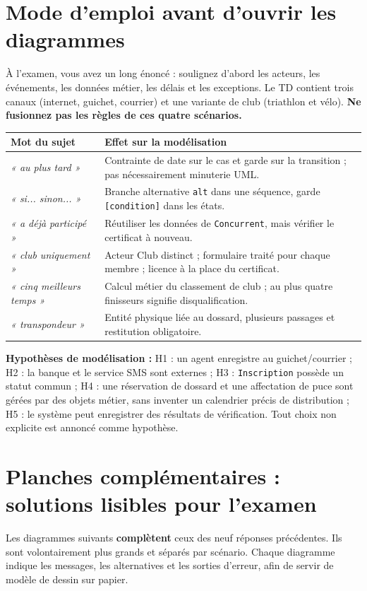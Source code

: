\documentclass[10pt,a4paper]{article}
\begin{document}
\section*{Mode d'emploi avant d'ouvrir les diagrammes}
\begin{memo}
À l'examen, vous avez un long énoncé : soulignez d'abord les acteurs, les événements, les données métier, les délais et les exceptions. Le TD contient trois canaux (internet, guichet, courrier) et une variante de club (triathlon et vélo). \textbf{Ne fusionnez pas les règles de ces quatre scénarios.}
\end{memo}
\begin{tabularx}{\linewidth}{@{}p{40mm}X@{}}\toprule
\textbf{Mot du sujet} & \textbf{Effet sur la modélisation} \\ \midrule
\textit{« au plus tard »} & Contrainte de date sur le cas et garde sur la transition ; pas nécessairement minuterie UML.\\
\textit{« si... sinon... »} & Branche alternative \texttt{alt} dans une séquence, garde \texttt{[condition]} dans les états.\\
\textit{« a déjà participé »} & Réutiliser les données de \texttt{Concurrent}, mais vérifier le certificat à nouveau.\\
\textit{« club uniquement »} & Acteur Club distinct ; formulaire traité pour chaque membre ; licence à la place du certificat.\\
\textit{« cinq meilleurs temps »} & Calcul métier du classement de club ; au plus quatre finisseurs signifie disqualification.\\
\textit{« transpondeur »} & Entité physique liée au dossard, plusieurs passages et restitution obligatoire.\\
\bottomrule\end{tabularx}
\textbf{Hypothèses de modélisation :} H1 : un agent enregistre au guichet/courrier ; H2 : la banque et le service SMS sont externes ; H3 : \texttt{Inscription} possède un statut commun ; H4 : une réservation de dossard et une affectation de puce sont gérées par des objets métier, sans inventer un calendrier précis de distribution ; H5 : le système peut enregistrer des résultats de vérification. Tout choix non explicite est annoncé comme hypothèse.
\newpage

\clearpage
\section{Planches complémentaires : solutions lisibles pour l'examen}
Les diagrammes suivants \textbf{complètent} ceux des neuf réponses précédentes. Ils sont volontairement plus grands et séparés par scénario. Chaque diagramme indique les messages, les alternatives et les sorties d'erreur, afin de servir de modèle de dessin sur papier.
\end{document}
